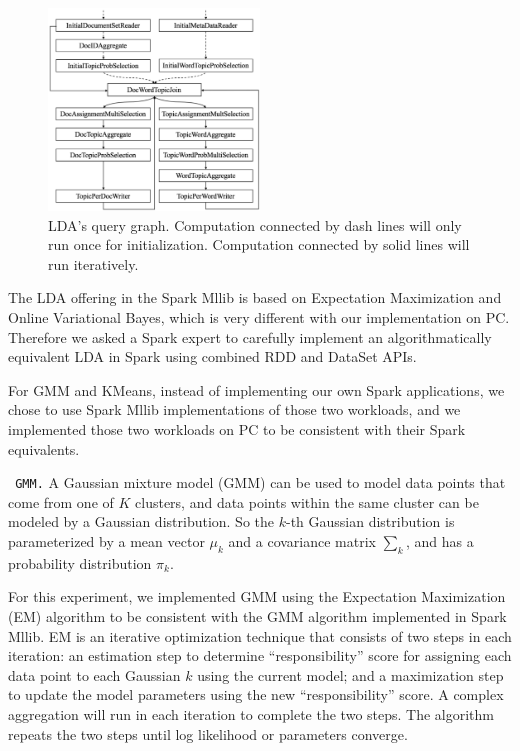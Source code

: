 \begin{figure}
\centering
\includegraphics[width=0.5\textwidth]{lda-query-graph.pdf}
  \caption{\label{fig:lda-query-graph} LDA's query graph. Computation
    connected by dash lines will only run once for
    initialization. Computation connected by solid lines will run iteratively.}
\end{figure}


\vspace{5pt}
The LDA offering in the Spark Mllib is based on Expectation
Maximization and Online Variational Bayes, which is very different
with our implementation on PC. Therefore we asked a Spark expert to carefully implement an algorithmatically
equivalent LDA in Spark using combined RDD and DataSet        
APIs. 

For GMM and KMeans, instead of implementing
our own Spark applications, we chose to use Spark Mllib
implementations of those two workloads, and we implemented those two
workloads on PC to be consistent with their Spark equivalents. 

\vspace{5pt}
\noindent
\texttt { GMM.} A Gaussian mixture model (GMM) can be used to model data points that come
from one of $K$ clusters, and data points within the same cluster
can be modeled by a Gaussian distribution. So the $k$-th Gaussian
distribution is parameterized by a mean vector $\mu_k$ and a covariance
matrix $\sum_k$, and has a probability distribution $\pi_k$.

For this experiment, we
implemented GMM using the Expectation Maximization (EM) algorithm to be
consistent with the GMM algorithm implemented in Spark Mllib. EM is an
iterative optimization technique that consists of two steps in each
iteration: an estimation step to determine ``responsibility'' score
for assigning each data point to each Gaussian $k$ using the current model; and a maximization step to
update the model parameters using the new ``responsibility'' score. A complex
aggregation will run in each iteration to complete the two steps. The algorithm repeats
the two steps until log likelihood or parameters converge. 


